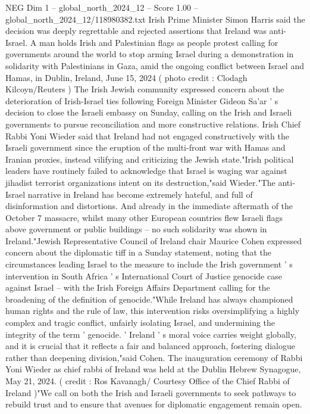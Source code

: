 \begin{textsample}{NEG Dim 1 – global\_north\_2024\_12 – Score 1.00 – global\_north\_2024\_12/118980382.txt}  \label{ex:f1_neg_225}
Irish Prime Minister Simon Harris said the decision was deeply regrettable and rejected assertions that Ireland was anti-Israel.
A man holds Irish and Palestinian flags as people protest calling for governments around the world to stop arming Israel during a demonstration in solidarity with Palestinians in Gaza, amid the ongoing conflict between Israel and Hamas, in Dublin, Ireland, June 15, 2024 ( photo credit : Clodagh Kilcoyn/Reuters ) The Irish Jewish community expressed concern about the deterioration of Irish-Israel ties following Foreign Minister Gideon Sa'ar ' s decision to close the Israeli embassy on Sunday, calling on the Irish and Israeli governments to pursue reconciliation and more constructive relations.
Irish Chief Rabbi Yoni Wieder said that Ireland had not engaged constructively with the Israeli government since the eruption of the multi-front war with Hamas and Iranian proxies, instead vilifying and criticizing the Jewish state."Irish political leaders have routinely failed to acknowledge that Israel is waging war against jihadist terrorist organizations intent on its destruction,"said Wieder."The anti-Israel narrative in Ireland has become extremely hateful, and full of disinformation and distortions.
And already in the immediate aftermath of the October 7 massacre, whilst many other European countries flew Israeli flags above government or public buildings -- no such solidarity was shown in Ireland."Jewish Representative Council of Ireland chair Maurice Cohen expressed concern about the diplomatic tiff in a Sunday statement, noting that the circumstances leading Israel to the measure to include the Irish government ' s intervention in South Africa ' s International Court of Justice genocide case against Israel -- with the Irish Foreign Affairs Department calling for the broadening of the definition of genocide."While Ireland has always championed human rights and the rule of law, this intervention risks oversimplifying a highly complex and tragic conflict, unfairly isolating Israel, and undermining the integrity of the term ' genocide. ' Ireland ' s moral voice carries weight globally, and it is crucial that it reflects a fair and balanced approach, fostering dialogue rather than deepening division,"said Cohen.
The inauguration ceremony of Rabbi Yoni Wieder as chief rabbi of Ireland was held at the Dublin Hebrew Synagogue, May 21, 2024. ( credit : Ros Kavanagh/ Courtesy Office of the Chief Rabbi of Ireland )"We call on both the Irish and Israeli governments to seek pathways to rebuild trust and to ensure that avenues for diplomatic engagement remain open.

\end{textsample}
